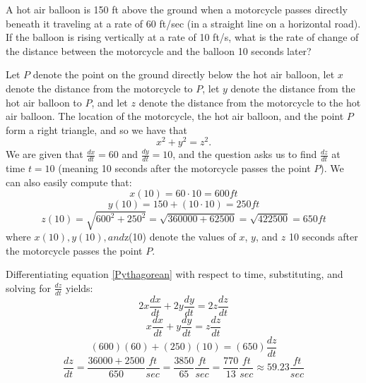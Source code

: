 \documentclass[handout,nooutcomes]{ximera}
\newcommand{\dd}[2][]{\frac{d #1}{d #2}}
\renewenvironment{freeResponse}{
\ifhandout\setbox0\vbox\bgroup\else
\begin{trivlist}\item[\hskip \labelsep\bfseries Solution:\hspace{2ex}]
\fi}
{\ifhandout\egroup\else
\end{trivlist}
\fi}
\begin{document}
\begin{problem}
A hot air balloon is 150 ft above the ground when a motorcycle passes directly beneath it traveling at a rate of 60 ft/sec (in a straight line on a horizontal road).  If the balloon is rising vertically at a rate of 10 ft/s, what is the rate of change of the distance between the motorcycle and the balloon 10 seconds later?
		\begin{freeResponse}
		Let $P$ denote the point on the ground directly below the hot air balloon, let $x$ denote the distance from the motorcycle to $P$, let $y$ denote the distance from the hot air balloon to $P$, and let $z$ denote the distance from the motorcycle to the hot air balloon.  The location of the motorcycle, the hot air balloon, and the point $P$ form a right triangle, and so we have that 
		\begin{equation}\label{Pythagorean}
		x^2 + y^2 = z^2.
		\end{equation}
		  We are given that $\dd[x]{t} = 60$ and $\dd[y]{t} = 10$, and the question asks us to find $\dd[z]{t}$ at time $t=10$ (meaning 10 seconds after the motorcycle passes the point $P$).  We can also easily compute that:
		$$ x(10) = 60 \cdot 10 = 600 ft $$
		$$ y(10) = 150 + (10 \cdot 10) = 250 ft $$
		$$ z(10) = \sqrt{ 600^2 + 250^2} = \sqrt{360000 + 62500} = \sqrt{422500} = 650 ft $$
		where $x(10), y(10), and $z(10) denote the values of $x$, $y$, and $z$ 10 seconds after the motorcycle passes the point $P$.  
		
		Differentiating equation \ref{Pythagorean} with respect to time, substituting, and solving for $\dd[z]{t}$ yields:
		$$ 2x \dd[x]{t} + 2y \dd[y]{t} = 2z \dd[z]{t} $$
		$$ x \dd[x]{t} + y \dd[y]{t} = z \dd[z]{t} $$
		$$ (600)(60) + (250)(10) = (650) \dd[z]{t} $$
		$$ \dd[z]{t} = \frac{36000 + 2500}{650} \frac{ft}{sec} = \frac{3850}{65} \frac{ft}{sec} = \frac{770}{13} \frac{ft}{sec} \approx 59.23 \frac{ft}{sec} $$
		
		\end{freeResponse}
			
			
		
\end{problem}
\end{document}
